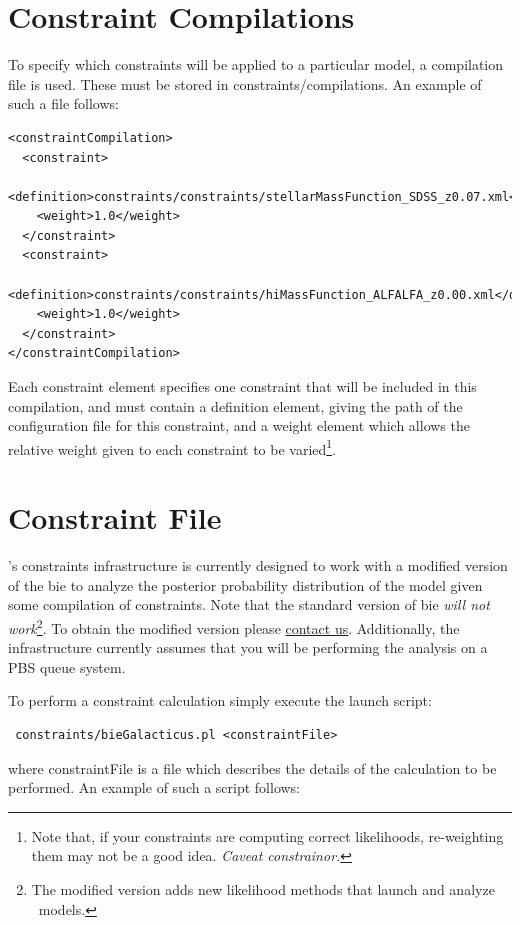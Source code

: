 \section{Constraint Compilations}

To specify which constraints will be applied to a particular model, a compilation file is used. These must be stored in {\normalfont \ttfamily constraints/compilations}. An example of such a file follows:
\begin{verbatim}
<constraintCompilation>
  <constraint>
    <definition>constraints/constraints/stellarMassFunction_SDSS_z0.07.xml</definition>
    <weight>1.0</weight>
  </constraint>
  <constraint>
    <definition>constraints/constraints/hiMassFunction_ALFALFA_z0.00.xml</definition>
    <weight>1.0</weight>
  </constraint>
</constraintCompilation>
\end{verbatim}
Each {\normalfont \ttfamily constraint} element specifies one constraint that will be included in this compilation, and must contain a {\normalfont \ttfamily definition} element, giving the path of the configuration file for this constraint, and a {\normalfont \ttfamily weight} element which allows the relative weight given to each constraint to be varied\footnote{Note that, if your constraints are computing correct likelihoods, re-weighting them may not be a good idea. \emph{Caveat constrainor.}}.

\section{Constraint File}

\glc's constraints infrastructure is currently designed to work with a modified version of the \gls{bie} to analyze the posterior probability distribution of the model given some compilation of constraints. Note that the standard version of \gls{bie} \emph{will not work}\footnote{The modified version adds new likelihood methods that launch and analyze \protect\glc\ models.}. To obtain the modified version please \href{mailto:abenson@obs.carnegiescience.edu}{contact us}. Additionally, the infrastructure currently assumes that you will be performing the analysis on a PBS queue system.

To perform a constraint calculation simply execute the launch script:
\begin{verbatim}
 constraints/bieGalacticus.pl <constraintFile>
\end{verbatim}
where {\normalfont \ttfamily constraintFile} is a file which describes the details of the calculation to be performed. An example of such a script follows:

